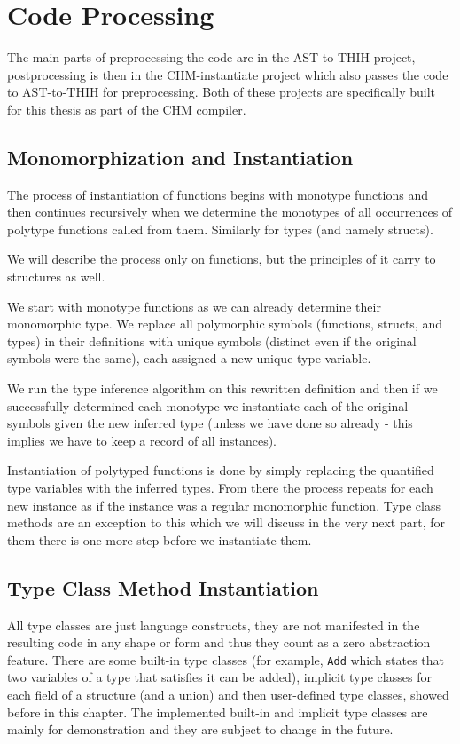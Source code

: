 \section{Code Processing}

The main parts of preprocessing the code are in the AST-to-THIH project, postprocessing is then in the CHM-instantiate project which also passes the code to AST-to-THIH for preprocessing. Both of these projects are specifically built for this thesis as part of the CHM compiler.

\subsection{Monomorphization and Instantiation}

The process of instantiation of functions begins with monotype functions and then continues recursively when we determine the monotypes of all occurrences of polytype functions called from them. Similarly for types (and namely structs).

We will describe the process only on functions, but the principles of it carry to structures as well.

We start with monotype functions as we can already determine their monomorphic type. We replace all polymorphic symbols (functions, structs, and types) in their definitions with unique symbols (distinct even if the original symbols were the same), each assigned a new unique type variable.

We run the type inference algorithm on this rewritten definition and then if we successfully determined each monotype we instantiate each of the original symbols given the new inferred type (unless we have done so already - this implies we have to keep a record of all instances).

Instantiation of polytyped functions is done by simply replacing the quantified type variables with the inferred types. From there the process repeats for each new instance as if the instance was a regular monomorphic function. Type class methods are an exception to this which we will discuss in the very next part, for them there is one more step before we instantiate them.

\subsection{Type Class Method Instantiation}

All type classes are just language constructs, they are not manifested in the resulting code in any shape or form and thus they count as a zero abstraction feature. There are some built-in type classes (for example, \lstinline{Add} which states that two variables of a type that satisfies it can be added), implicit type classes for each field of a structure (and a union) and then user-defined type classes, showed before in this chapter. The implemented built-in and implicit type classes are mainly for demonstration and they are subject to change in the future.


